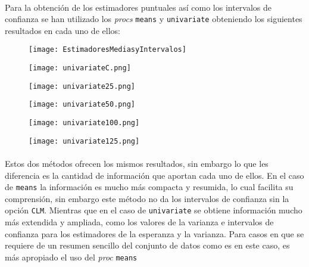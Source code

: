 \documentclass{article}
\begin{document}
      \paragraph{}
      Para la obtención de los estimadores puntuales así como los intervalos de confianza se han utilizado los \emph{procs} \texttt{means} y \texttt{univariate} obteniendo los siguientes resultados en cada uno de ellos:

      \begin{figure}[H]
        \centering
        \texttt{[image: EstimadoresMediasyIntervalos]}
      \end{figure}

      \begin{figure}[H]
        \centering
        \texttt{[image: univariateC.png]}
      \end{figure}

      \begin{figure}[H]
        \centering
        \texttt{[image: univariate25.png]}
      \end{figure}

      \begin{figure}[H]
        \centering
        \texttt{[image: univariate50.png]}
      \end{figure}

      \begin{figure}[H]
        \centering
        \texttt{[image: univariate100.png]}
      \end{figure}

      \begin{figure}[H]
        \centering
        \texttt{[image: univariate125.png]}
      \end{figure}

      \paragraph{}
      Estos dos métodos ofrecen los mismos resultados, sin embargo lo que les diferencia es la cantidad de información que aportan cada uno de ellos. En el caso de \texttt{means} la información es mucho más compacta y resumida, lo cual facilita su comprensión, sin embargo este método no da los intervalos de confianza sin la opción \texttt{CLM}. Mientras que en el caso de \texttt{univariate} se obtiene información mucho más extendida y ampliada, como los valores de la varianza e intervalos de confianza para los estimadores de la esperanza y la varianza. Para casos en que se requiere de un resumen sencillo del conjunto de datos como es en este caso, es más apropiado el uso del \emph{proc} \texttt{means}
\end{document}
